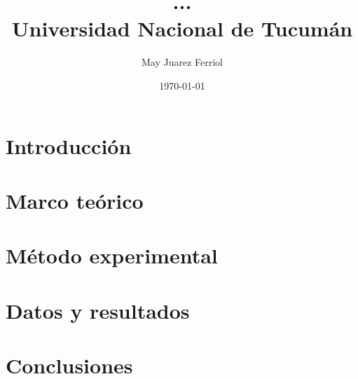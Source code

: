\documentclass[a4paper,twocolumn,12pt]{article}
\title{ ... \\ 
\medskip \large Universidad Nacional de Tucumán}
\author{May Juarez Ferriol}
\date{\today}
\begin{document}
\maketitle

\begin{abstract}



\end{abstract} 

\section*{Introducción}

    

\section*{Marco teórico}

    

\section*{Método experimental}

    

\section*{Datos y resultados}

    

\section*{Conclusiones}

    




\end{document}
